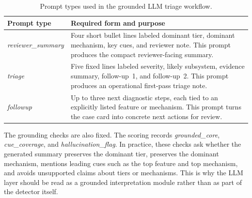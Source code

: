 \begin{table}[!t]
\centering
\caption{Prompt types used in the grounded LLM triage workflow.}
\label{tab:app_llm_prompts}
{\scriptsize
\setlength{\tabcolsep}{3.0pt}
\renewcommand{\arraystretch}{1.02}
\begin{tabularx}{\columnwidth}{@{}l >{\raggedright\arraybackslash}X@{}}
\toprule
Prompt type & Required form and purpose \\
\midrule
\textit{reviewer\_summary} & Four short bullet lines labeled dominant tier, dominant mechanism, key cues, and reviewer note. This prompt produces the compact reviewer-facing summary. \\
\textit{triage} & Five fixed lines labeled severity, likely subsystem, evidence summary, follow-up~1, and follow-up~2. This prompt produces an operational first-pass triage note. \\
\textit{followup} & Up to three next diagnostic steps, each tied to an explicitly listed feature or mechanism. This prompt turns the case card into concrete next actions for review. \\
\bottomrule
\end{tabularx}
}
\end{table}

The grounding checks are also fixed. The scoring records \textit{grounded\_core}, \textit{cue\_coverage}, and \textit{hallucination\_flag}. In practice, these checks ask whether the generated summary preserves the dominant tier, preserves the dominant mechanism, mentions leading cues such as the top feature and top mechanism, and avoids unsupported claims about tiers or mechanisms. This is why the LLM layer should be read as a grounded interpretation module rather than as part of the detector itself.

